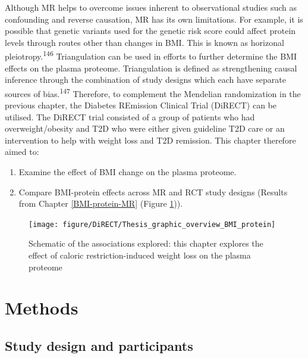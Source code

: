 \documentclass[11pt,twoside]{bristolthesis}
\providecommand{\tightlist}{%
  \setlength{\itemsep}{0pt}\setlength{\parskip}{0pt}}
\begin{document}
Although MR helps to overcome issues inherent to observational studies such as confounding and reverse causation, MR has its own limitations. For example, it is possible that genetic variants used for the genetic risk score could affect protein levels through routes other than changes in BMI. This is known as horizonal pleiotropy.\textsuperscript{146} Triangulation can be used in efforts to further determine the BMI effects on the plasma proteome. Triangulation is defined as strengthening causal inference through the combination of study designs which each have separate sources of bias.\textsuperscript{147} Therefore, to complement the Mendelian randomization in the previous chapter, the Diabetes REmission Clinical Trial (DiRECT) can be utilised. The DiRECT trial consisted of a group of patients who had overweight/obesity and T2D who were either given guideline T2D care or an intervention to help with weight loss and T2D remission. This chapter therefore aimed to:
\begin{enumerate}
\def\labelenumi{\arabic{enumi})}
\tightlist
\item
  Examine the effect of BMI change on the plasma proteome.
\item
  Compare BMI-protein effects across MR and RCT study designs (Results from Chapter \ref{BMI-protein-MR} (Figure \ref{fig:BMI-protein-graphic2})).
\end{enumerate}
\begin{figure}
\texttt{[image: figure/DiRECT/Thesis\_graphic\_overview\_BMI\_protein]} \caption[Schematic of the associations explored in chapter]{Schematic of the associations explored: this chapter explores the effect of caloric restriction-induced weight loss on the plasma proteome}\label{fig:BMI-protein-graphic2}
\end{figure}
\hypertarget{methods-4}{%
\section{Methods}\label{methods-4}}

\hypertarget{study-design-and-participants}{%
\subsection{Study design and participants}\label{study-design-and-participants}}
\end{document}
